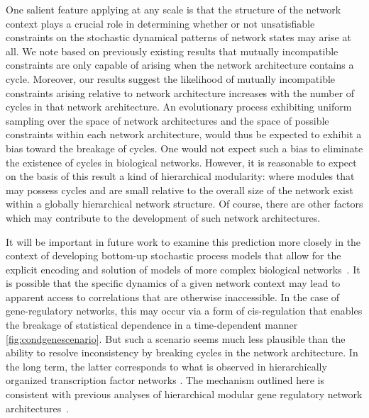 One salient feature applying at any scale is that the structure of the network context plays a crucial role in determining whether or not unsatisfiable constraints on the stochastic dynamical patterns of network states may arise at all. We note based on previously existing results that mutually incompatible constraints are only capable of arising when the network architecture contains a cycle. Moreover, our results suggest the likelihood of mutually incompatible constraints arising relative to network architecture increases with the number of cycles in that network architecture. An evolutionary process exhibiting uniform sampling over the space of network architectures and the space of possible constraints within each network architecture, would thus be expected to exhibit a bias toward the breakage of cycles. One would not expect such a bias to eliminate the existence of cycles in biological networks. However, it is reasonable to expect on the basis of this result a kind of hierarchical modularity: where modules that may possess cycles and are small relative to the overall size of the network exist within a globally hierarchical network structure. Of course, there are other factors which may contribute to the development of such network architectures.

It will be important in future work to examine this prediction more closely in the context of developing bottom-up stochastic process models that allow for the explicit encoding and solution of models of more complex biological networks~\cite{Walczak2009,Mugler2009}. It is possible that the specific dynamics of a given network context may lead to apparent access to correlations that are otherwise inaccessible. In the case of gene-regulatory networks, this may occur via a form of cis-regulation that enables the breakage of statistical dependence in a time-dependent manner \ref{fig:condgenescenario}. But such a scenario seems much less plausible than the ability to resolve inconsistency by breaking cycles in the network architecture. In the long term, the latter corresponds to what is observed in hierarchically organized transcription factor networks \cite{Jothi2009,Bhardwaj2010,Chalancon2012,Colm}. The mechanism outlined here is consistent with previous analyses of hierarchical modular gene regulatory network architectures~\cite{Ravasz2002,Segre2005,Wagner2007,Erwin2009,Jothi2009,Bhardwaj2010,Colm}.

